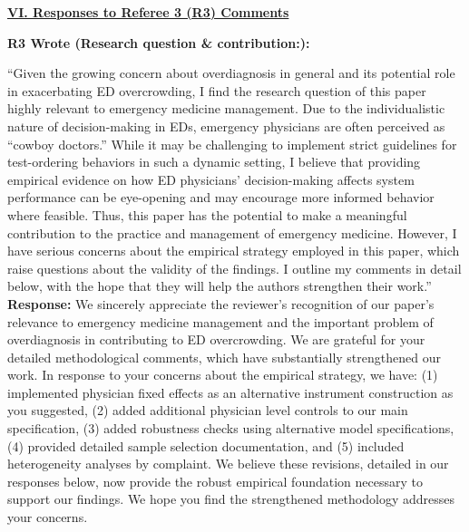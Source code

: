 \documentclass[11pt]{article}
\newenvironment{quote2}
{ \bigskip
\noindent
         \small\em
         \baselineskip=14pt
}
\newcommand{\1}{\hbox{\rm 1\kern-.35em 1}}
\begin{document}
\clearpage




\pagestyle{fancy}
\fancyhead{}
\renewcommand{\headrulewidth}{0pt}

\noindent\underline{\textbf{VI. Responses to Referee 3 (R3) Comments}}



\begin{quote2}
\textbf{R3 Wrote (Research question \& contribution:):}  

\noindent``Given the growing concern about overdiagnosis in general and its potential role in exacerbating ED overcrowding, I find the research question of this paper highly relevant to emergency medicine management. Due to the individualistic nature of decision-making in EDs, emergency physicians are often perceived as ``cowboy doctors.'' While it may be challenging to implement strict guidelines for test-ordering behaviors in such a dynamic setting, I believe that providing empirical evidence on how ED physicians’ decision-making affects system performance can be eye-opening and may encourage more informed behavior where feasible. Thus, this paper has the potential to make a meaningful contribution to the practice and management of emergency medicine. However, I have serious concerns about the empirical strategy employed in this paper, which raise questions about the validity of the findings. I outline my comments in detail below, with the hope that they will help the authors strengthen their work.''
\end{quote2}

\noindent\textbf{Response:} \color{blue}
We sincerely appreciate the reviewer's recognition of our paper's relevance to emergency medicine management and the important problem of overdiagnosis in contributing to ED overcrowding. We are grateful for your detailed methodological comments, which have substantially strengthened our work. In response to your concerns about the empirical strategy, we have: (1) implemented physician fixed effects as an alternative instrument construction as you suggested, (2) added additional physician level controls to our main specification, (3) added robustness checks using alternative model specifications, (4) provided detailed sample selection documentation, and (5) included heterogeneity analyses by complaint. We believe these revisions, detailed in our responses below, now provide the robust empirical foundation necessary to support our findings. We hope you find the strengthened methodology addresses your concerns.
\color{black}
\end{document}
